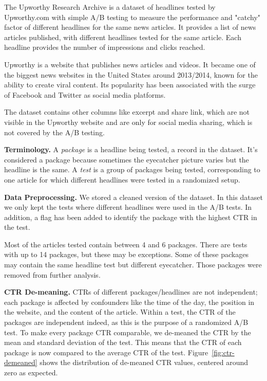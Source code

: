 \documentclass[11pt]{article}
\begin{document}
The Upworthy Research Archive is a dataset of headlines tested by Upworthy.com with simple A/B testing to measure the performance and "catchy" factor of different headlines for the same news articles. It provides a list of news articles published, with different headlines tested for the same article. Each headline provides the number of impressions and clicks reached.

Upworthy is a website that publishes news articles and videos. It became one of the biggest news websites in the United States around 2013/2014, known for the ability to create viral content. Its popularity has been associated with the surge of Facebook and Twitter as social media platforms.

The dataset contains other columns like excerpt and share link, which are not visible in the Upworthy website and are only for social media sharing, which is not covered by the A/B testing.

\textbf{Terminology.} A \textit{package} is a headline being tested, a record in the dataset. It's considered a package because sometimes the eyecatcher picture varies but the headline is the same. A \textit{test} is a group of packages being tested, corresponding to one article for which different headlines were tested in a randomized setup.

\textbf{Data Preprocessing.} We stored a cleaned version of the dataset. In this dataset we only kept the tests where different headlines were used in the A/B tests. In addition, a flag has been added to identify the package with the highest CTR in the test.

Most of the articles tested contain between 4 and 6 packages. There are tests with up to 14 packages, but these may be exceptions. Some of these packages may contain the same headline test but different eyecatcher. Those packages were removed from further analysis.

\textbf{CTR De-meaning.} CTRs of different packages/headlines are not independent; each package is affected by confounders like the time of the day, the position in the website, and the content of the article. Within a test, the CTR of the packages are independent indeed, as this is the purpose of a randomized A/B test. To make every package CTR comparable, we de-meaned the CTR by the mean and standard deviation of the test. This means that the CTR of each package is now compared to the average CTR of the test. Figure~\ref{fig:ctr-demeaned} shows the distribution of de-meaned CTR values, centered around zero as expected.
\end{document}
